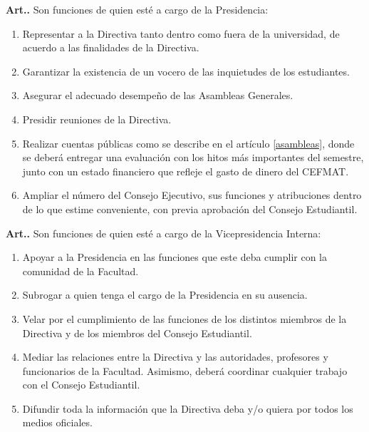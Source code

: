 \documentclass[letterpaper,11pt]{article}
\newcounter{art}
\newenvironment{art}{\refstepcounter{art}\mbox{\textbf{Art.{\space}\theart.}}\ignorespaces}{}
\begin{document}
\begin{art}\label{funcionesPresidencia}
    Son funciones de quien esté a cargo de la Presidencia:
    \begin{enumerate}
        \item Representar a la Directiva tanto dentro como fuera de la universidad, de acuerdo a las finalidades de la Directiva.
        \item Garantizar la existencia de un vocero de las inquietudes de los estudiantes.
        \item Asegurar el adecuado desempeño de las Asambleas Generales.
        \item Presidir reuniones de la Directiva.
        \item Realizar cuentas públicas como se describe en el artículo \ref{asambleas}, donde se deberá entregar una evaluación con los hitos más importantes del semestre, junto con un estado financiero que refleje el gasto de dinero del CEFMAT.
        \item Ampliar el número del Consejo Ejecutivo, sus funciones y atribuciones dentro de lo que estime conveniente, con previa aprobación del Consejo Estudiantil.
    \end{enumerate}
\end{art}

\begin{art}\label{funcionesVicepresidenciaInterno}
    Son funciones de quien esté a cargo de la Vicepresidencia Interna:
    \begin{enumerate}
        \item Apoyar a la Presidencia en las funciones que este deba cumplir con la comunidad de la Facultad.
        \item Subrogar a quien tenga el cargo de la Presidencia en su ausencia.
        \item Velar por el cumplimiento de las funciones de los distintos miembros de la Directiva y de los miembros del Consejo Estudiantil.
        \item Mediar las relaciones entre la Directiva y las autoridades, profesores y funcionarios de la Facultad. Asimismo, deberá coordinar cualquier trabajo con el Consejo Estudiantil.
        \item Difundir toda la información que la Directiva deba y/o quiera por todos los medios oficiales.
    \end{enumerate}
\end{art}
\end{document}
